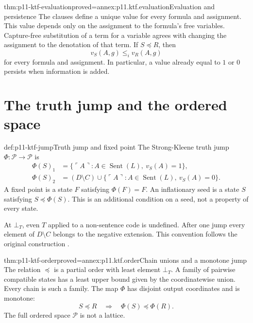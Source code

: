 \begin{hblemma}{thm:p11-ktf-evaluation}{proved=annex:p11.ktf.evaluation}{Evaluation and persistence}
The clauses define a unique value for every formula and assignment. This
value depends only on the assignment to the formula's free variables.
Capture-free substitution of a term for a variable agrees with changing
the assignment to the denotation of that term.
If \(S\preceq R\), then
\[
 v_S(A,g)\leq_i v_R(A,g)
\]
for every formula and assignment. In particular, a value already equal to
\(1\) or \(0\) persists when information is added.
\end{hblemma}

\section{The truth jump and the ordered space}

\begin{hbdefinition}{def:p11-ktf-jump}{Truth jump and fixed point}
The Strong-Kleene truth jump \(\Phi:\mathcal P\to\mathcal P\) is
\[
 \begin{split}
 \Phi(S)_1&=\{\ulcorner A\urcorner:A\in\operatorname{Sent}(L),\ v_S(A)=1\},\\
 \Phi(S)_2&=(D\setminus C)\cup
 \{\ulcorner A\urcorner:A\in\operatorname{Sent}(L),\ v_S(A)=0\}.
 \end{split}
\]
A fixed point is a state \(F\) satisfying \(\Phi(F)=F\).
An inflationary seed is a state \(S\) satisfying \(S\preceq\Phi(S)\).
This is an additional condition on a seed, not a property of every state.

At \(\bot_T\), even \(T\) applied to a non-sentence code is undefined.
After one jump every element of \(D\setminus C\) belongs to the negative
extension. This convention follows the original construction
\cite[pp.~702--703]{Kripke1975}.
\end{hbdefinition}

\begin{hblemma}{thm:p11-ktf-order}{proved=annex:p11.ktf.order}{Chain unions and a monotone jump}
The relation \(\preceq\) is a partial order with least element
\(\bot_T\). A family of pairwise compatible states has a least upper
bound given by the coordinatewise union. Every chain is such a family.
The map \(\Phi\) has disjoint output coordinates and is monotone:
\[
 S\preceq R\quad\Longrightarrow\quad\Phi(S)\preceq\Phi(R).
\]
The full ordered space \(\mathcal P\) is not a lattice.
\end{hblemma}

